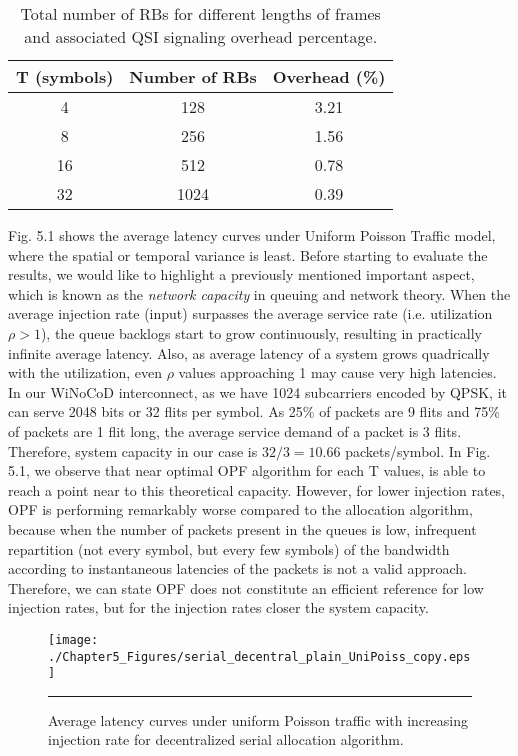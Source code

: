 \begin{table}[]
\centering
\caption{Total number of RBs for different lengths of frames and associated QSI signaling overhead percentage.}
\label{Total number of RBs for different lengths of frames and associated QSI signaling overhead percentage.}
\begin{tabular}{|c|c|c|}
T (symbols)			& Number of RBs    & Overhead (\%)     \\ \hline	
4                    & 128    & 3.21     \\ \hline
8        &256    & 1.56  \\ \hline
16      & 512   & 0.78 \\ \hline
32 & 1024    & 0.39  \\ \hline
\end{tabular}
\end{table}


Fig. 5.1 shows the average latency curves under Uniform Poisson Traffic model, where the spatial or temporal variance is least. Before starting to evaluate the results, we would like to highlight a previously mentioned important aspect, which is known as the \textit{network capacity} in queuing and network theory. When the average injection rate (input) surpasses the average service rate (i.e. utilization $\rho>1$), the queue backlogs start to grow continuously, resulting in practically infinite average latency. Also, as average latency of a system grows quadrically with the utilization, even $\rho$ values approaching 1 may cause very high latencies. In our WiNoCoD interconnect, as we have 1024 subcarriers encoded by QPSK, it can serve 2048 bits or 32 flits per symbol. As 25\% of packets are 9 flits and 75\% of packets are 1 flit long, the average service demand of a packet is 3 flits. Therefore, system capacity in our case is $32/3 = 10.66$ packets/symbol. In Fig. 5.1, we observe that near optimal OPF algorithm for each T values, is able to reach a point near to this theoretical capacity. However, for lower injection rates, OPF is performing remarkably worse compared to the allocation algorithm, because when the number of packets present in the queues is low, infrequent repartition (not every symbol, but every few symbols) of the bandwidth according to instantaneous latencies of the packets is not a valid approach. Therefore, we can state OPF does not constitute an efficient reference for low injection rates, but for the injection rates closer the system capacity.     



\begin{figure}[htbp]
  \centering
    \texttt{[image: ./Chapter5\_Figures/serial\_decentral\_plain\_UniPoiss\_copy.eps]}
    \rule{35em}{0.5pt}
  \caption[Decentralized Serial Allocation Average latency under uniform Poisson]{Average latency curves under uniform Poisson traffic with increasing injection rate for decentralized serial allocation algorithm.}
  \label{fig:Electron}
\end{figure}


